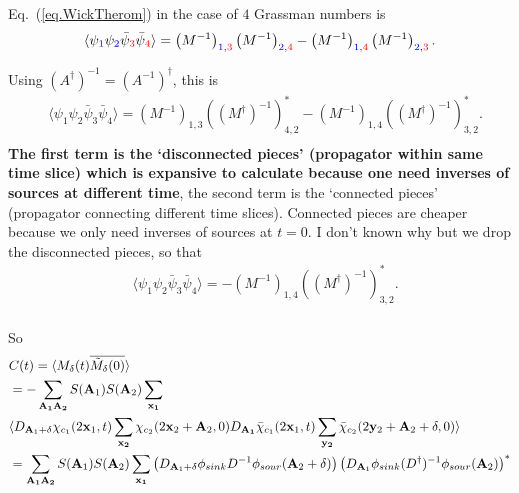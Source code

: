 Eq.~(\ref{eq.WickTherom}) in the case of $4$ Grassman numbers is
\begin{equation}
\begin{split}
&\langle \psi _{\textcolor[rgb]{0,0,1}{1}}\psi_{\textcolor[rgb]{0,0,1}{2}} \bar{\psi} _{\textcolor[rgb]{1,0,0}{3}} \bar{\psi}_{\textcolor[rgb]{1,0,0}{4}}\rangle = \left(M^{-1}\right)_{\textcolor[rgb]{0,0,1}{1},\textcolor[rgb]{1,0,0}{3}}\left(M^{-1}\right)_{\textcolor[rgb]{0,0,1}{2},\textcolor[rgb]{1,0,0}{4}}- \left(M^{-1}\right)_{\textcolor[rgb]{0,0,1}{1},\textcolor[rgb]{1,0,0}{4}}\left(M^{-1}\right)_{\textcolor[rgb]{0,0,1}{2},\textcolor[rgb]{1,0,0}{3}}.\\
\end{split}
\end{equation}

Using $(A^{\dagger})^{-1}=(A^{-1})^{\dagger}$, this is
\begin{equation}
\begin{split}
&\langle \psi _1\psi_2 \bar{\psi} _3 \bar{\psi}_4\rangle = \left(M^{-1}\right)_{1,3}\left((M^{\dagger})^{-1}\right)_{4,2}^*- \left(M^{-1}\right)_{1,4}\left((M^{\dagger})^{-1}\right)_{3,2}^*.\\
\end{split}
\end{equation}
\textcolor[rgb]{1,0,0}{\textbf{The first term is the `disconnected pieces' (propagator within same time slice) which is expansive to calculate because one need inverses of sources at different time}, the second term is the `connected pieces' (propagator connecting different time slices). Connected pieces are cheaper because we only need inverses of sources at $t=0$.} I don't known why but we drop the disconnected pieces, so that
\begin{equation}
\begin{split}
&\langle \psi _1\psi_2 \bar{\psi} _3 \bar{\psi}_4\rangle = - \left(M^{-1}\right)_{1,4}\left((M^{\dagger})^{-1}\right)_{3,2}^*.\\
\end{split}
\end{equation}

So
\begin{equation}
\begin{split}
&C(t)=\langle M_{\delta}(t) \overline{\tilde{M} _{\delta}(0)}\rangle \\
&=-\sum _{\bf A _1 A_2}S({\bf A}_1)S({\bf A}_2)\sum _{\bf x _1}\\
&\langle D_{{\bf A}_1+\delta}\chi _{c_1} (2{\bf x}_1,t) \sum _{\bf x _2} \chi_{c_2}(2{\bf x}_2+{\bf A}_2,0)D_{\bf A_1}\bar{\chi}_{c_1}(2{\bf x}_1,t)\sum _{\bf y_2}\bar{\chi} _{c_2} (2{\bf y}_2+{\bf A}_2+\delta,0) \rangle\\
&=\sum _{\bf A _1 A_2}S({\bf A}_1)S({\bf A}_2)\sum _{\bf x _1} \left(D_{{\bf A}_1+\delta} \phi_{sink}D^{-1}\phi_{sour}({\bf A}_2+\delta)\right)\left(D_{{\bf A}_1} \phi_{sink}(D^{\dagger})^{-1}\phi_{sour}({\bf A}_2)\right)^*
\end{split}
\end{equation}

